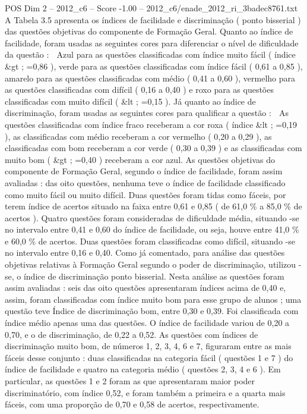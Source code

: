 \begin{textsample}{POS Dim 2 – 2012\_c6 – Score -1.00 – 2012\_c6/enade\_2012\_ri\_3badec8761.txt}
A Tabela 3.5 apresenta os índices de facilidade e discriminação ( ponto bisserial ) das questões objetivas do componente de Formação Geral.
Quanto ao índice de facilidade, foram usadas as seguintes cores para diferenciar o nível de dificuldade da questão :  Azul para as questões classificadas com índice muito fácil ( índice \&gt ; =0,86 ), verde para as questões classificadas com índice fácil ( 0,61 a 0,85 ), amarelo para as questões classificadas com médio ( 0,41 a 0,60 ), vermelho para as questões classificadas com difícil ( 0,16 a 0,40 ) e roxo para as questões classificadas com muito difícil ( \&lt ; =0,15 ).
Já quanto ao índice de discriminação, foram usadas as seguintes cores para qualificar a questão :  As questões classificadas com índice fraco receberam a cor roxa ( índice \&lt ; =0,19 ), as classificadas com médio receberam a cor vermelho ( 0,20 a 0,29 ), as classificadas com bom receberam a cor verde ( 0,30 a 0,39 ) e as classificadas com muito bom ( \&gt ; =0,40 ) receberam a cor azul.
As questões objetivas do componente de Formação Geral, segundo o índice de facilidade, foram assim avaliadas : das oito questões, nenhuma teve o índice de facilidade classificado como muito fácil ou muito difícil.
Duas questões foram tidas como fáceis, por terem índice de acertos situado na faixa entre 0,61 e 0,85 ( de 61,0 \% a 85,0 \% de acertos ).
Quatro questões foram consideradas de dificuldade média, situando -se no intervalo entre 0,41 e 0,60 do índice de facilidade, ou seja, houve entre 41,0 \% e 60,0 \% de acertos.
Duas questões foram classificadas como difícil, situando -se no intervalo entre 0,16 e 0,40.
Como já comentado, para análise das questões objetivas relativas à Formação Geral segundo o poder de discriminação, utilizou -se, o índice de discriminação ponto bisserial.
Nesta análise as questões foram assim avaliadas : seis das oito questões apresentaram índices acima de 0,40 e, assim, foram classificadas com índice muito bom para esse grupo de alunos ; uma questão teve Índice de discriminação bom, entre 0,30 e 0,39.
Foi classificada com índice médio apenas uma das questões.
O índice de facilidade variou de 0,20 a 0,70, e o de discriminação, de 0,22 a 0,52.
As questões com índices de discriminação muito bom, de números 1, 2, 3, 4, 6 e 7, figuraram entre as mais fáceis desse conjunto : duas classificadas na categoria fácil ( questões 1 e 7 ) do índice de facilidade e quatro na categoria médio ( questões 2, 3, 4 e 6 ).
Em particular, as questões 1 e 2 foram as que apresentaram maior poder discriminatório, com índice 0,52, e foram também a primeira e a quarta mais fáceis, com uma proporção de 0,70 e 0,58 de acertos, respectivamente.

\end{textsample}
